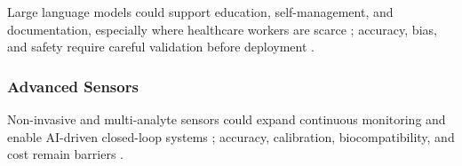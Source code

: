 Large language models could support education, self-management, and documentation, especially where healthcare workers are scarce \cite{mackenzie2023diabetes, li2024integrated, ghosh2025artificial}; accuracy, bias, and safety require careful validation before deployment \cite{mackenzie2023diabetes}.

\subsubsection{Advanced Sensors}

Non-invasive and multi-analyte sensors could expand continuous monitoring and enable AI-driven closed-loop systems \cite{alhaddad2022sense, rodriguez2023applications}; accuracy, calibration, biocompatibility, and cost remain barriers \cite{alhaddad2022sense, mackenzie2023diabetes}.
